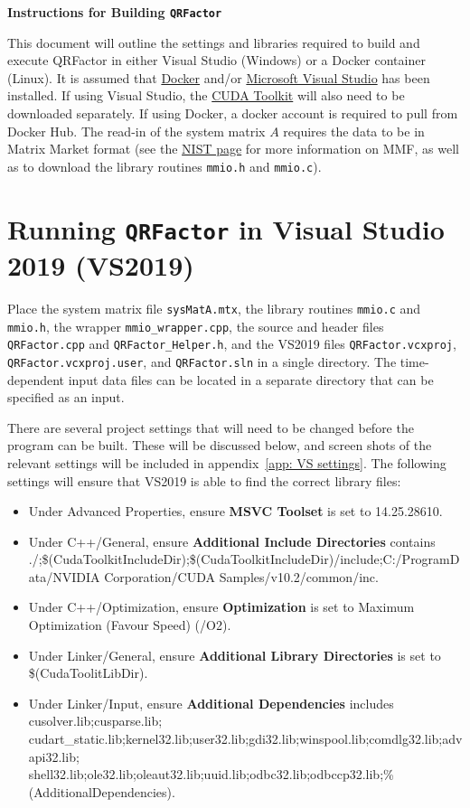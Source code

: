 \documentclass[11pt,letterpaper]{article}
\begin{document}
\begin{center}
  {\Large \bf Instructions for Building \texttt{QRFactor}}
\end{center}

This document will outline the settings and libraries required to build and 
execute QRFactor in either Visual Studio (Windows) or a Docker container (Linux). 
It is assumed that \href{https://docs.docker.com/get-docker/}{Docker} and/or 
\href{https://visualstudio.microsoft.com/downloads/}{Microsoft Visual Studio} has 
been installed. If using Visual Studio, the \href{https://developer.nvidia.com/cuda-downloads}{CUDA Toolkit}
will also need to be downloaded separately. If using Docker, a docker account is required
to pull from Docker Hub.
The read-in of the system matrix $A$ requires the data to be in Matrix Market format 
(see the \href{https://math.nist.gov/MatrixMarket/formats.html}{NIST page} for more
information on MMF, as well as to download the library routines \texttt{mmio.h} 
and \texttt{mmio.c}).

\section{Running \texttt{QRFactor} in Visual Studio 2019 (VS2019)}
\label{sec: vs}

Place the system matrix file \texttt{sysMatA.mtx}, 
the library routines \texttt{mmio.c} and \texttt{mmio.h}, 
the wrapper \texttt{mmio\_wrapper.cpp}, the source and header files \texttt{QRFactor.cpp}
and \texttt{QRFactor\_Helper.h}, and the VS2019 files \texttt{QRFactor.vcxproj}, 
\texttt{QRFactor.vcxproj.user}, and \texttt{QRFactor.sln} in a single directory. 
The time-dependent input data files can be located in a separate directory that can be 
specified as an input.

There are several project settings that will need to be changed before the program can be built. These will be discussed below, and screen shots of the relevant settings will be included in appendix~\ref{app: VS settings}. The following settings will ensure that VS2019 is able to find the correct library files:
\begin{itemize}
\item Under Advanced Properties, ensure {\bf MSVC Toolset} is set to 14.25.28610.
\item Under C++/General, ensure {\bf Additional Include Directories} contains ./;\$(CudaToolkitIncludeDir);\$(CudaToolkitIncludeDir)/include;C:/ProgramData/NVIDIA Corporation/CUDA Samples/v10.2/common/inc.
\item Under C++/Optimization, ensure {\bf Optimization} is set to Maximum Optimization (Favour Speed) (/O2).
\item Under Linker/General, ensure {\bf Additional Library Directories} is set to \$(CudaToolitLibDir).
\item Under Linker/Input, ensure {\bf Additional Dependencies} includes cusolver.lib;cusparse.lib; cudart\_static.lib;kernel32.lib;user32.lib;gdi32.lib;winspool.lib;comdlg32.lib;advapi32.lib; \\ shell32.lib;ole32.lib;oleaut32.lib;uuid.lib;odbc32.lib;odbccp32.lib;\%(AdditionalDependencies).
\end{itemize}
\end{document}
